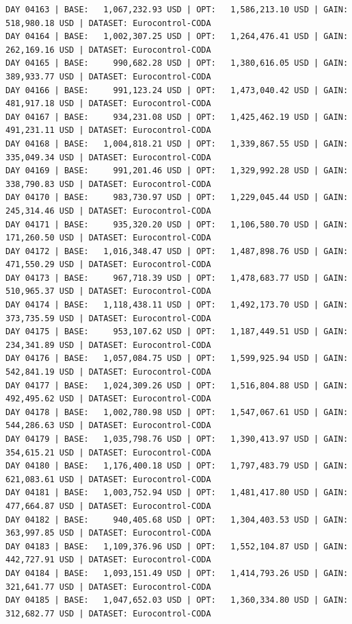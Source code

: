 \documentclass[11pt,a4paper]{article}
\begin{document}
\begin{verbatim}
DAY 04163 | BASE:   1,067,232.93 USD | OPT:   1,586,213.10 USD | GAIN: 518,980.18 USD | DATASET: Eurocontrol-CODA
DAY 04164 | BASE:   1,002,307.25 USD | OPT:   1,264,476.41 USD | GAIN: 262,169.16 USD | DATASET: Eurocontrol-CODA
DAY 04165 | BASE:     990,682.28 USD | OPT:   1,380,616.05 USD | GAIN: 389,933.77 USD | DATASET: Eurocontrol-CODA
DAY 04166 | BASE:     991,123.24 USD | OPT:   1,473,040.42 USD | GAIN: 481,917.18 USD | DATASET: Eurocontrol-CODA
DAY 04167 | BASE:     934,231.08 USD | OPT:   1,425,462.19 USD | GAIN: 491,231.11 USD | DATASET: Eurocontrol-CODA
DAY 04168 | BASE:   1,004,818.21 USD | OPT:   1,339,867.55 USD | GAIN: 335,049.34 USD | DATASET: Eurocontrol-CODA
DAY 04169 | BASE:     991,201.46 USD | OPT:   1,329,992.28 USD | GAIN: 338,790.83 USD | DATASET: Eurocontrol-CODA
DAY 04170 | BASE:     983,730.97 USD | OPT:   1,229,045.44 USD | GAIN: 245,314.46 USD | DATASET: Eurocontrol-CODA
DAY 04171 | BASE:     935,320.20 USD | OPT:   1,106,580.70 USD | GAIN: 171,260.50 USD | DATASET: Eurocontrol-CODA
DAY 04172 | BASE:   1,016,348.47 USD | OPT:   1,487,898.76 USD | GAIN: 471,550.29 USD | DATASET: Eurocontrol-CODA
DAY 04173 | BASE:     967,718.39 USD | OPT:   1,478,683.77 USD | GAIN: 510,965.37 USD | DATASET: Eurocontrol-CODA
DAY 04174 | BASE:   1,118,438.11 USD | OPT:   1,492,173.70 USD | GAIN: 373,735.59 USD | DATASET: Eurocontrol-CODA
DAY 04175 | BASE:     953,107.62 USD | OPT:   1,187,449.51 USD | GAIN: 234,341.89 USD | DATASET: Eurocontrol-CODA
DAY 04176 | BASE:   1,057,084.75 USD | OPT:   1,599,925.94 USD | GAIN: 542,841.19 USD | DATASET: Eurocontrol-CODA
DAY 04177 | BASE:   1,024,309.26 USD | OPT:   1,516,804.88 USD | GAIN: 492,495.62 USD | DATASET: Eurocontrol-CODA
DAY 04178 | BASE:   1,002,780.98 USD | OPT:   1,547,067.61 USD | GAIN: 544,286.63 USD | DATASET: Eurocontrol-CODA
DAY 04179 | BASE:   1,035,798.76 USD | OPT:   1,390,413.97 USD | GAIN: 354,615.21 USD | DATASET: Eurocontrol-CODA
DAY 04180 | BASE:   1,176,400.18 USD | OPT:   1,797,483.79 USD | GAIN: 621,083.61 USD | DATASET: Eurocontrol-CODA
DAY 04181 | BASE:   1,003,752.94 USD | OPT:   1,481,417.80 USD | GAIN: 477,664.87 USD | DATASET: Eurocontrol-CODA
DAY 04182 | BASE:     940,405.68 USD | OPT:   1,304,403.53 USD | GAIN: 363,997.85 USD | DATASET: Eurocontrol-CODA
DAY 04183 | BASE:   1,109,376.96 USD | OPT:   1,552,104.87 USD | GAIN: 442,727.91 USD | DATASET: Eurocontrol-CODA
DAY 04184 | BASE:   1,093,151.49 USD | OPT:   1,414,793.26 USD | GAIN: 321,641.77 USD | DATASET: Eurocontrol-CODA
DAY 04185 | BASE:   1,047,652.03 USD | OPT:   1,360,334.80 USD | GAIN: 312,682.77 USD | DATASET: Eurocontrol-CODA

\end{verbatim}
\end{document}
